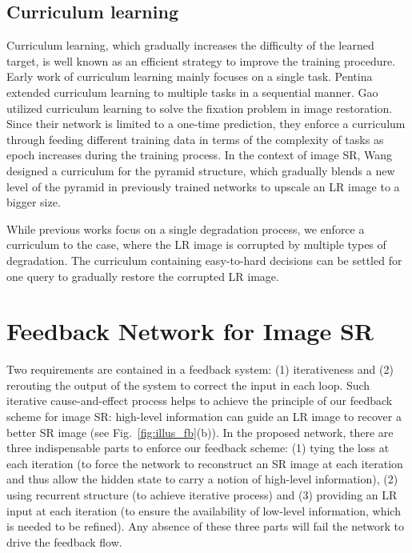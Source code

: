 \documentclass[10pt,twocolumn,letterpaper]{article}
\begin{document}
	\subsection{Curriculum learning}
	Curriculum learning\cite{Bengio2009Curriculum}, which gradually increases the difficulty of the learned target, is well known as an efficient strategy to improve the training procedure. Early work of curriculum learning mainly focuses on a single task. Pentina \etal~\cite{Pentina2014Curriculum} extended curriculum learning to multiple tasks in a sequential manner. Gao \etal~\cite{Gao2017On} utilized curriculum learning to solve the fixation problem in image restoration. Since their network is limited to a one-time prediction, they enforce a curriculum through feeding different training data in terms of the complexity of tasks as epoch increases during the training process. In the context of image SR, Wang \etal~\cite{Wang2018A} designed a curriculum for the pyramid structure, which gradually blends a new level of the pyramid in previously trained networks to upscale an LR image to a bigger size.
	
	While previous works focus on a single degradation process, we enforce a curriculum to the case, where the LR image is corrupted by multiple types of degradation. The curriculum containing easy-to-hard decisions can be settled for one query to gradually restore the corrupted LR image.
	
	\section{Feedback Network for Image SR}
	\label{3.1}
	Two requirements are contained in a feedback system: (1) iterativeness and (2) rerouting the output of the system to correct the	input in each loop. Such iterative cause-and-effect process helps to achieve the principle of our feedback scheme for	image SR: high-level information can guide an LR image to recover a better SR image (see Fig.~\ref{fig:illus_fb}(b)). In the proposed	network, there are three indispensable parts to enforce our feedback scheme: (1) tying the loss at each iteration (to force the network to reconstruct an SR image at each iteration and thus allow the hidden state to carry a notion of high-level information), (2) using recurrent structure (to achieve iterative process) and (3) providing an LR input at each iteration (to ensure the availability of low-level information, which is needed to be refined). Any absence of these three parts will fail the network to drive the feedback flow.
\end{document}

